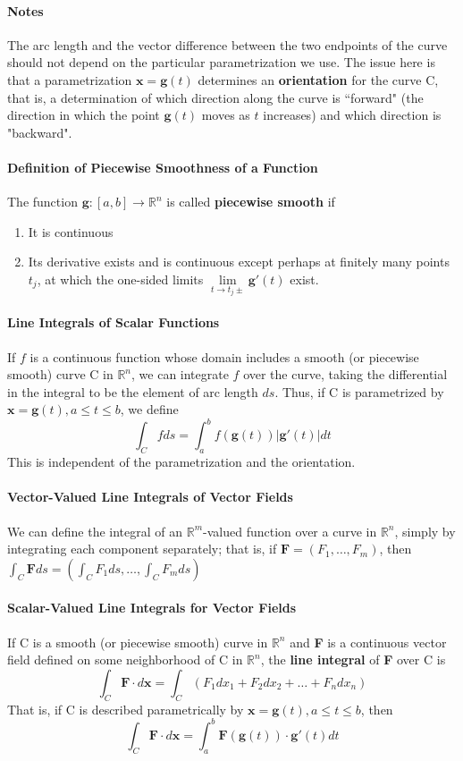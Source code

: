 \documentclass[11pt]{article}
\newcommand{\tb}[1]{\textbf{#1}}
\newcommand{\real}[0]{\mathbb{R}}
\newcommand{\vx}[0]{\tb{x}}
\begin{document}
\paragraph{Notes} The arc length and the vector difference between the two endpoints of the curve should not depend on the particular parametrization we use. The issue here is that a parametrization $\vx = \tb{g}(t)$ determines an \tb{orientation} for the curve C, that is, a determination of which direction along the curve is ``forward" (the direction in which the point $\tb{g}(t)$ moves as $t$ increases) and which direction is "backward". 
\paragraph{Definition of Piecewise Smoothness of a Function} The function $\tb{g}: [a,b] \rightarrow \real^n$ is called \tb{piecewise smooth} if
\begin{enumerate}
    \item It is continuous
    \item Its derivative exists and is continuous except perhaps at finitely many points $t_j$, at which the one-sided limits $\underset{t\rightarrow t_j\pm}{\lim}\tb{g}'(t)$ exist. 
\end{enumerate}
\paragraph{Line Integrals of Scalar Functions} 
If $f$ is a continuous function whose domain includes a smooth (or piecewise smooth) curve C in $\real^n$, we can integrate $f$ over the curve, taking the differential in the integral to be the element of arc length $ds$. Thus, if C is parametrized by $\vx = \tb{g}(t), a\leq t \leq b$, we define
$$\int_C f ds = \int_a^b f(\tb{g}(t))|\tb{g}'(t)|dt$$ This is independent of the parametrization and the orientation.
\paragraph{Vector-Valued Line Integrals of Vector Fields} We can define the integral of an $\real^m$-valued function over a curve in $\real^n$, simply by integrating each component separately; that is, if $\tb{F} = (F_1,\hdots,F_m)$, then $\int_C\tb{F}ds = (\int_C F_1ds,\hdots,\int_C F_mds)$
\paragraph{Scalar-Valued Line Integrals for Vector Fields} If C is a smooth (or piecewise smooth) curve in $\real^n$ and \tb{F} is a continuous vector field defined on some neighborhood of C in $\real^n$, the \tb{line integral} of \tb{F} over C is
$$\int_C \tb{F} \cdot d\vx = \int_C (F_1dx_1+F_2dx_2+\hdots+F_ndx_n)$$
That is, if C is described parametrically by $\vx = \tb{g}(t), a\leq t\leq b$, then
$$\int_C \tb{F} \cdot d\vx = \int_a^b\tb{F}(\tb{g}(t))\cdot \tb{g}'(t)dt$$
\end{document}
